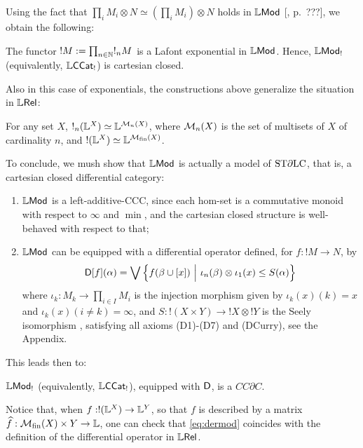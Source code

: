 Using the fact that $\prod_{i}M_{i}\otimes  N\simeq (\prod_{i}M_{i})\otimes N$ holds in $\mathbb{L}\mathsf{Mod}$ [\cite{}, p.~???], we obtain the following:
\begin{theorem}
The functor $!M:= \prod_{n\in \mathbb{N}}!_{n}M$ is a Lafont exponential in $\mathbb{L}\mathsf{Mod}$.
Hence, $\mathbb{L}\mathsf{Mod}_{!}$ (equivalently, $\mathbb{L}\mathsf{CCat}_{!}$) is cartesian closed. 
\end{theorem}

Also in this case of exponentials, the constructions above generalize the situation in $\mathbb{L} \mathsf{Rel}$:
\begin{proposition}
For any set $X$, 
$!_{n}(\mathbb{L}^{X})\simeq \mathbb{L}^{\mathcal{M}_{n}(X)}$, where
$\mathcal{M}_{n}(X)$ is the set of multisets of $X$ of cardinality $n$, and 
$!(\mathbb{L}^{X})\simeq \mathbb{L}^{\mathcal{M}_{\mathrm{fin}}(X)}$. 
\end{proposition}

To conclude, we mush show that $\mathbb{L}\mathsf{Mod}$ is actually a model of $\mathrm{ST}\partial\mathrm{LC}$, that is, a cartesian closed differential category:
\begin{enumerate}
\item $\mathbb{L}\mathsf{Mod}$ is a left-additive-CCC, since each hom-set is a commutative monoid with respect to $\infty$ and $\min$, and the cartesian closed structure is well-behaved with respect to that;

\item $\mathbb{L}\mathsf{Mod}$ can be equipped with a differential operator defined, for $f:!M\to N$, by 
\begin{align}\label{eq:dermod}
\Der[f](\alpha)=
\bigvee\left\{
f(\beta\cup [x]) \ \Big \vert  \ 
\iota_{n}(\beta)\otimes \iota_{1}(x) \leq S(\alpha)
\right\}
\end{align}
where $\iota_{k}: M_{k}\to \prod_{i\in I}M_{i}$ is the injection morphism given by $\iota_{k}(x)( k)=x$ and $\iota_{k}(x)(i\neq k)=\infty$,
and $S: !(X\times Y)\to !X\otimes !Y$ is the Seely isomorphism \cite{}, 
satisfying all axioms (D1)-(D7) and (DCurry), see the Appendix.
\end{enumerate}

This leads then to:
\begin{theorem}
$\mathbb{L}\mathsf{Mod}_{!}$ (equivalently, $\mathbb{L}\mathsf{CCat}_{!}$), equipped with $\mathsf{D}$, is a $CC\partial C$.
\end{theorem}

Notice that, when $f:!(\mathbb{L}^{X})\to \mathbb{L}^{Y}$, so that $f$ is described by a matrix $\widehat f: \mathcal{M}_{\mathrm{fin}}(X)\times Y\to \mathbb{L}$, one can check that \eqref{eq:dermod} coincides with the definition of the differential operator in $\mathbb{L} \mathsf{Rel}$.




